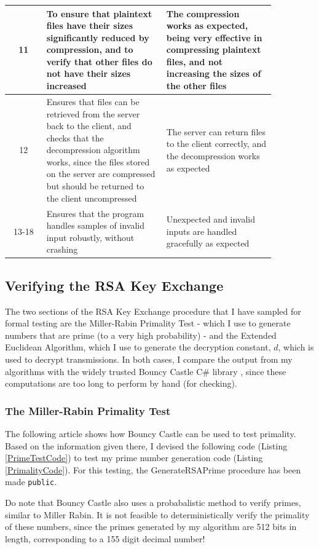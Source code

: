\documentclass[../main.tex]{subfiles}
\begin{document}
\begin{longtable}{|c|p{0.45\linewidth}|p{0.41\linewidth}|}
    \hline
    11 & To ensure that plaintext files have their sizes significantly reduced by compression, and to verify that other files do not have their sizes increased & The compression works as expected, being very effective in compressing plaintext files, and not increasing the sizes of the other files \\
    \hline
    12 & Ensures that files can be retrieved from the server back to the client, and checks that the decompression algorithm works, since the files stored on the server are compressed but should be returned to the client uncompressed & The server can return files to the client correctly, and the decompression works as expected \\
    \hline
    13-18 & Ensures that the program handles samples of invalid input robustly, without crashing & Unexpected and invalid inputs are handled gracefully as expected \\
    \hline
\end{longtable}

\subsection{Verifying the RSA Key Exchange}

The two sections of the RSA Key Exchange procedure that I have sampled for formal testing are the Miller-Rabin Primality Test - which I use to generate numbers that are prime (to a very high probability) - and the Extended Euclidean Algorithm, which I use to generate the decryption constant, $d$, which is used to decrypt transmissions. In both cases, I compare the output from my algorithms with the widely trusted Bouncy Castle C\# library \cite{bouncycastleGH}, since these computations are too long to perform by hand (for checking).

\subsubsection{The Miller-Rabin Primality Test}

The following article \cite{asecuritysite_63142} shows how Bouncy Castle can be used to test primality. Based on the information given there, I devised the following code (Listing \ref{PrimeTestCode}) to test my prime number generation code (Listing \ref{PrimalityCode}). For this testing, the GenerateRSAPrime procedure has been made \texttt{public}.

Do note that Bouncy Castle also uses a probabalistic method to verify primes, similar to Miller Rabin. It is not feasible to deterministically verify the primality of these numbers, since the primes generated by my algorithm are 512 bits in length, corresponding to a 155 digit decimal number!
\end{document}
